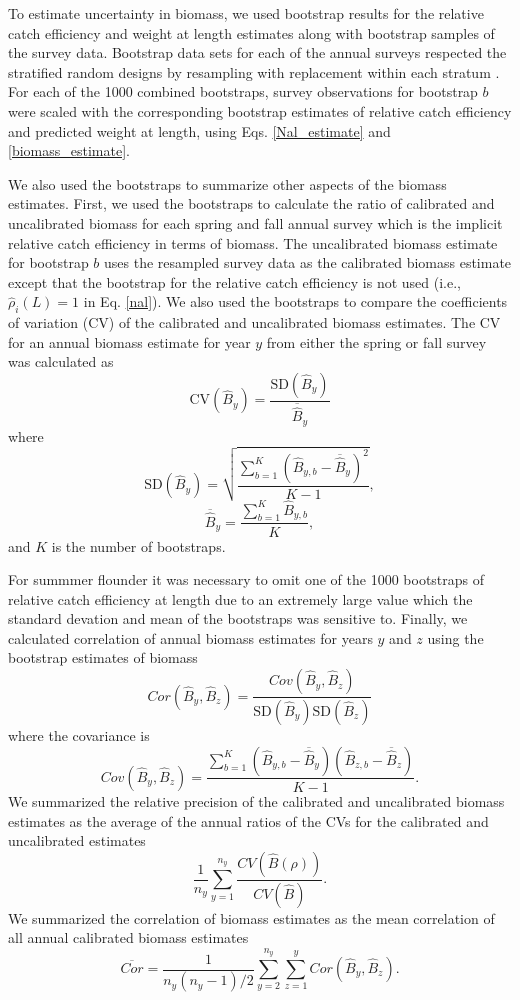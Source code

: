 \documentclass[
  12pt,
]{article}
\begin{document}
To estimate uncertainty in biomass, we used bootstrap results for the
relative catch efficiency and weight at length estimates along with
bootstrap samples of the survey data. Bootstrap data sets for each of
the annual surveys respected the stratified random designs by resampling
with replacement within each stratum \citep{smith97}. For each of the
1000 combined bootstraps, survey observations for bootstrap \(b\) were
scaled with the corresponding bootstrap estimates of relative catch
efficiency and predicted weight at length, using Eqs. \ref{Nal_estimate}
and \ref{biomass_estimate}.

We also used the bootstraps to summarize other aspects of the biomass
estimates. First, we used the bootstraps to calculate the ratio of
calibrated and uncalibrated biomass for each spring and fall annual
survey which is the implicit relative catch efficiency in terms of
biomass. The uncalibrated biomass estimate for bootstrap \(b\) uses the
resampled survey data as the calibrated biomass estimate except that the
bootstrap for the relative catch efficiency is not used (i.e.,
\(\widehat \rho_i\left(L\right) = 1\) in Eq. \ref{nal}). We also used
the bootstraps to compare the coefficients of variation (CV) of the
calibrated and uncalibrated biomass estimates. The CV for an annual
biomass estimate for year \(y\) from either the spring or fall survey
was calculated as \[
\text{CV}\left(\widehat B_y\right) = \frac{\text{SD}\left(\widehat B_y\right)}{\overline{\widehat B}_y}
\] where \[
\text{SD}\left(\widehat B_y\right) = \sqrt{\frac{\sum_{b=1}^K \left(\widehat B_{y,b} - \overline{\widehat B}_y\right)^2}{K-1}},
\] \[
\overline{\widehat B}_y = \frac{\sum_{b=1}^K \widehat B_{y,b}}{K},
\] and \(K\) is the number of bootstraps.

For summmer flounder it was necessary to omit one of the 1000 bootstraps
of relative catch efficiency at length due to an extremely large value
which the standard devation and mean of the bootstraps was sensitive to.
Finally, we calculated correlation of annual biomass estimates for years
\(y\) and \(z\) using the bootstrap estimates of biomass \[
Cor\left(\widehat B_y, \widehat B_z\right) = \frac{Cov\left(\widehat B_y, \widehat B_z\right)}{\text{SD}\left(\widehat B_y\right)\text{SD}\left(\widehat B_z\right)}
\] where the covariance is \[
Cov\left(\widehat B_y, \widehat B_z\right) = \frac{\sum_{b=1}^K \left(\widehat B_{y,b} - \overline{\widehat B}_y\right)\left(\widehat B_{z,b} - \overline{\widehat B}_z\right)}{K-1}.
\] We summarized the relative precision of the calibrated and
uncalibrated biomass estimates as the average of the annual ratios of
the CVs for the calibrated and uncalibrated estimates \[
\frac{1}{n_y} \sum^{n_y}_{y = 1}\frac{CV\left(\widehat B\left(\rho\right)\right)}{CV\left(\widehat B\right)}.
\] We summarized the correlation of biomass estimates as the mean
correlation of all annual calibrated biomass estimates \[
\overline {Cor} = \frac{1}{n_y(n_y-1)/2} \sum_{y=2}^{n_y} \sum_{z=1}^{y} Cor\left(\widehat B_y, \widehat B_z\right).
\]
\end{document}
